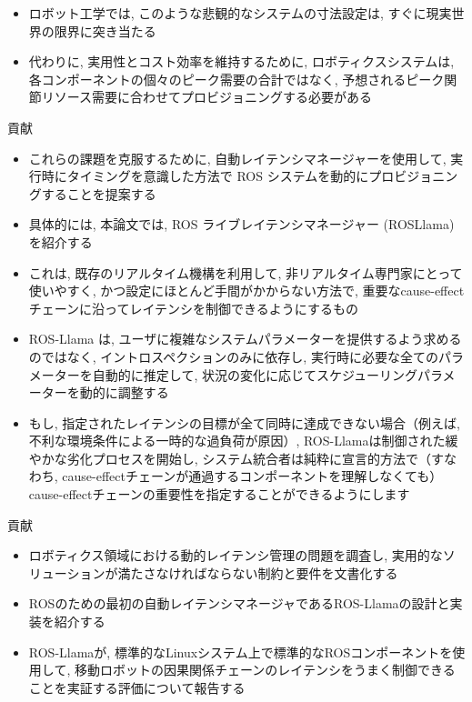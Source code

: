 \begin{frame}{}
    \begin{itemize}
        \item ロボット工学では, このような悲観的なシステムの寸法設定は, すぐに現実世界の限界に突き当たる
        \item 代わりに, 実用性とコスト効率を維持するために, ロボティクスシステムは, 各コンポーネントの個々のピーク需要の合計ではなく, 予想されるピーク関節リソース需要に合わせてプロビジョニングする必要がある
    \end{itemize}
\end{frame}

\begin{frame}{貢献}
    \begin{itemize}
        \item これらの課題を克服するために, 自動レイテンシマネージャーを使用して, 実行時にタイミングを意識した方法で ROS システムを動的にプロビジョニングすることを提案する
        \item 具体的には, 本論文では, ROS ライブレイテンシマネージャー (ROSLlama) を紹介する
        \item これは, 既存のリアルタイム機構を利用して, 非リアルタイム専門家にとって使いやすく, かつ設定にほとんど手間がかからない方法で, 重要なcause-effectチェーンに沿ってレイテンシを制御できるようにするもの
    \end{itemize}
\end{frame}

\begin{frame}{}
    \begin{itemize}
        \item ROS-Llama は, ユーザに複雑なシステムパラメーターを提供するよう求めるのではなく, イントロスペクションのみに依存し, 実行時に必要な全てのパラメーターを自動的に推定して, 状況の変化に応じてスケジューリングパラメーターを動的に調整する
        \item もし, 指定されたレイテンシの目標が全て同時に達成できない場合（例えば, 不利な環境条件による一時的な過負荷が原因）, ROS-Llamaは制御された緩やかな劣化プロセスを開始し, システム統合者は純粋に宣言的方法で（すなわち, cause-effectチェーンが通過するコンポーネントを理解しなくても）cause-effectチェーンの重要性を指定することができるようにします
    \end{itemize}
\end{frame}

\begin{frame}{貢献}
    \begin{itemize}
        \item  ロボティクス領域における動的レイテンシ管理の問題を調査し, 実用的なソリューションが満たさなければならない制約と要件を文書化する

        \item  ROSのための最初の自動レイテンシマネージャであるROS-Llamaの設計と実装を紹介する

        \item ROS-Llamaが, 標準的なLinuxシステム上で標準的なROSコンポーネントを使用して, 移動ロボットの因果関係チェーンのレイテンシをうまく制御できることを実証する評価について報告する

    \end{itemize}
\end{frame}


